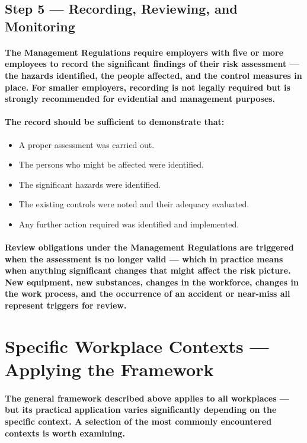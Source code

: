 \subsection{Step 5 — Recording, Reviewing, and Monitoring}
\paragraph{The Management Regulations require employers with five or more employees to record the significant findings of their risk assessment — the hazards identified, the people affected, and the control measures in place. For smaller employers, recording is not legally required but is strongly recommended for evidential and management purposes.}
\paragraph{The record should be sufficient to demonstrate that:}
\begin{itemize}
    \item{A proper assessment was carried out.}
    \item{The persons who might be affected were identified.}
    \item{The significant hazards were identified.}
    \item{The existing controls were noted and their adequacy evaluated.}
    \item{Any further action required was identified and implemented.}
\end{itemize}
\paragraph{Review obligations under the Management Regulations are triggered when the assessment is no longer valid — which in practice means when anything significant changes that might affect the risk picture. New equipment, new substances, changes in the workforce, changes in the work process, and the occurrence of an accident or near-miss all represent triggers for review.}

\section{Specific Workplace Contexts — Applying the Framework}
\paragraph{The general framework described above applies to all workplaces — but its practical application varies significantly depending on the specific context. A selection of the most commonly encountered contexts is worth examining.}

